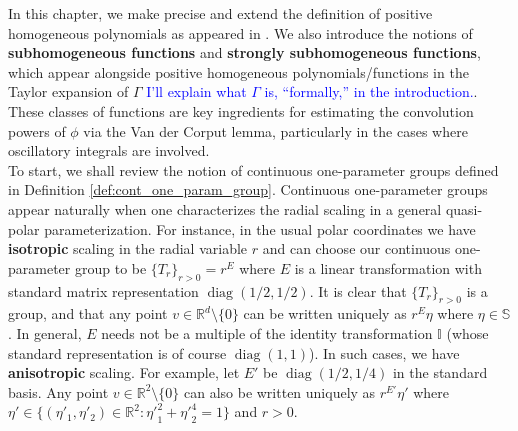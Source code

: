 \documentclass[11pt, letter]{book}
\newcommand\diag{\operatorname{diag}}
\begin{document}
In this chapter, we make precise and extend the definition of positive homogeneous polynomials as appeared in \cite{randles_convolution_2017}. We also introduce the notions of \textbf{subhomogeneous functions} and \textbf{strongly subhomogeneous functions}, which appear alongside positive homogeneous polynomials/functions in the Taylor expansion of $\Gamma$ \textcolor{blue}{I'll explain what $\Gamma$ is, ``formally,'' in the introduction.}. These classes of functions are key ingredients for estimating the convolution powers of $\phi$ via the Van der Corput lemma, particularly in the cases where oscillatory integrals are involved.\\

\noindent To start, we shall review the notion of continuous one-parameter groups defined in Definition \ref{def:cont_one_param_group}. Continuous one-parameter groups appear naturally when one characterizes the radial scaling in a general quasi-polar parameterization. For instance, in the usual polar coordinates we have \textbf{isotropic} scaling in the radial variable $r$ and can choose our continuous one-parameter group to be $\{T_r \}_{r>0} = r^E$ where $E$ is a linear transformation with standard matrix representation $\diag(1/2, 1/2)$. It is clear that $\{T_r \}_{r>0}$ is a group, and that any point $v\in \mathbb{R}^d \setminus \{0\}$ can be written uniquely as $r^E \eta$ where $\eta\in \mathbb{S}$. In general, $E$ needs not be a multiple of the identity transformation $\mathbb{I}$ (whose standard representation is of course $\diag(1,1)$). In such cases, we have \textbf{anisotropic} scaling. For example, let $E'$ be $\diag(1/2, 1/4)$ in the standard basis. Any point $v\in \mathbb{R}^2\setminus\{0\}$ can also be written uniquely as $r^{E'}\eta'$ where $\eta' \in \{ (\eta'_1,\eta'_2) \in \mathbb{R}^2 : {\eta'}_1^{2} + {\eta'}_2^{4} = 1  \}$ and $r> 0$. 
\end{document}
